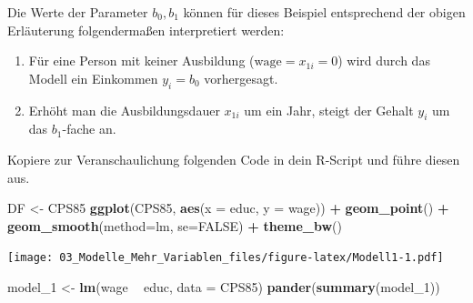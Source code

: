 \documentclass[]{article}
\newenvironment{Shaded}{\begin{snugshade}}{\end{snugshade}}
\newcommand{\KeywordTok}[1]{\textcolor[rgb]{0.13,0.29,0.53}{\textbf{#1}}}
\newcommand{\DataTypeTok}[1]{\textcolor[rgb]{0.13,0.29,0.53}{#1}}
\newcommand{\DecValTok}[1]{\textcolor[rgb]{0.00,0.00,0.81}{#1}}
\newcommand{\StringTok}[1]{\textcolor[rgb]{0.31,0.60,0.02}{#1}}
\newcommand{\OtherTok}[1]{\textcolor[rgb]{0.56,0.35,0.01}{#1}}
\newcommand{\OperatorTok}[1]{\textcolor[rgb]{0.81,0.36,0.00}{\textbf{#1}}}
\newcommand{\NormalTok}[1]{#1}
\providecommand{\tightlist}{%
  \setlength{\itemsep}{0pt}\setlength{\parskip}{0pt}}
\begin{document}
Die Werte der Parameter \(b_0, b_1\) können für dieses Beispiel
entsprechend der obigen Erläuterung folgendermaßen interpretiert werden:

\begin{enumerate}
\def\labelenumi{\arabic{enumi}.}
\tightlist
\item
  Für eine Person mit keiner Ausbildung (\(\textrm{wage} = x_{1i} = 0\))
  wird durch das Modell ein Einkommen \(y_i = b_0\) vorhergesagt.
\item
  Erhöht man die Ausbildungsdauer \(x_{1i}\) um ein Jahr, steigt der
  Gehalt \(y_i\) um das \(b_1\)-fache an.
\end{enumerate}

Kopiere zur Veranschaulichung folgenden Code in dein R-Script und führe
diesen aus.

\begin{Shaded}
\begin{Highlighting}[]
\NormalTok{  DF <-}\StringTok{ }\NormalTok{CPS85}
  \KeywordTok{ggplot}\NormalTok{(CPS85, }\KeywordTok{aes}\NormalTok{(}\DataTypeTok{x =}\NormalTok{ educ, }\DataTypeTok{y =}\NormalTok{ wage)) }\OperatorTok{+}
\StringTok{    }\KeywordTok{geom_point}\NormalTok{() }\OperatorTok{+}
\StringTok{    }\KeywordTok{geom_smooth}\NormalTok{(}\DataTypeTok{method=}\NormalTok{lm, }\DataTypeTok{se=}\OtherTok{FALSE}\NormalTok{) }\OperatorTok{+}
\StringTok{    }\KeywordTok{theme_bw}\NormalTok{()}
\end{Highlighting}
\end{Shaded}

\texttt{[image: 03\_Modelle\_Mehr\_Variablen\_files/figure-latex/Modell1-1.pdf]}

\begin{Shaded}
\begin{Highlighting}[]
\NormalTok{  model_}\DecValTok{1}\NormalTok{     <-}\StringTok{ }\KeywordTok{lm}\NormalTok{(wage }\OperatorTok{~}\StringTok{ }\NormalTok{educ, }\DataTypeTok{data =}\NormalTok{ CPS85)}
  \KeywordTok{pander}\NormalTok{(}\KeywordTok{summary}\NormalTok{(model_}\DecValTok{1}\NormalTok{))}
\end{Highlighting}
\end{Shaded}
\end{document}
